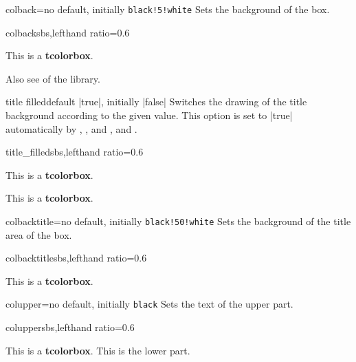 \begin{docTcbKey}{colback}{=}{no default, initially \texttt{black!5!white}}
  Sets the background  of the box.
\begin{exdispExample*}{colback}{sbs,lefthand ratio=0.6}
\begin{tcolorbox}[colback=red!50!white]
This is a \textbf{tcolorbox}.
\end{tcolorbox}
\end{exdispExample*}
\end{docTcbKey}

Also see  of the  library.

\begin{docTcbKey}{title filled}{}{default |true|, initially |false|}
  Switches the drawing of the title background according to the given value.
  This option is set to |true| automatically by ,
  , and ,
  and .

\begin{exdispExample*}{title_filled}{sbs,lefthand ratio=0.6}
\begin{tcolorbox}[title=My title,title filled]
This is a \textbf{tcolorbox}.
\end{tcolorbox}
\begin{tcolorbox}[title=My title,
  title filled=false]
This is a \textbf{tcolorbox}.
\end{tcolorbox}
\end{exdispExample*}
\end{docTcbKey}


\begin{docTcbKey}{colbacktitle}{=}{no default, initially \texttt{black!50!white}}
  Sets the background  of the title area of the box.
\begin{exdispExample*}{colbacktitle}{sbs,lefthand ratio=0.6}
\begin{tcolorbox}[colbacktitle=red!50!white,
  title=My title,coltitle=black,
  fonttitle=\bfseries]
This is a \textbf{tcolorbox}.
\end{tcolorbox}
\end{exdispExample*}
\end{docTcbKey}



\clearpage

\begin{docTcbKey}{colupper}{=}{no default, initially \texttt{black}}
  Sets the text  of the upper part.
\begin{exdispExample*}{colupper}{sbs,lefthand ratio=0.6}
\begin{tcolorbox}[colupper=red!75!black]
This is a \textbf{tcolorbox}.
\tcblower
This is the lower part.
\end{tcolorbox}
\end{exdispExample*}
\end{docTcbKey}


